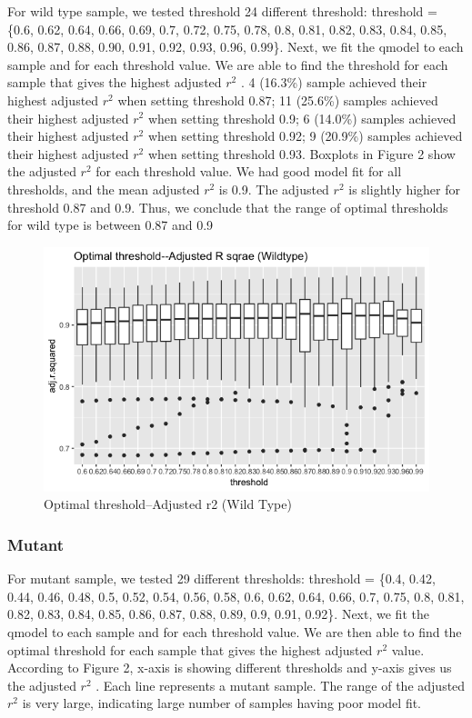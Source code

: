 \documentclass[10pt,letterpaper]{article}
\begin{document}
For wild type sample, we tested threshold 24 different threshold:
threshold = \{0.6, 0.62, 0.64, 0.66, 0.69, 0.7, 0.72, 0.75, 0.78, 0.8,
0.81, 0.82, 0.83, 0.84, 0.85, 0.86, 0.87, 0.88, 0.90, 0.91, 0.92, 0.93,
0.96, 0.99\}. Next, we fit the qmodel to each sample and for each
threshold value. We are able to find the threshold for each sample that
gives the highest adjusted \(r^2\) . 4 (16.3\%) sample achieved their
highest adjusted \(r^2\) when setting threshold 0.87; 11 (25.6\%)
samples achieved their highest adjusted \(r^2\) when setting threshold
0.9; 6 (14.0\%) samples achieved their highest adjusted \(r^2\) when
setting threshold 0.92; 9 (20.9\%) samples achieved their highest
adjusted \(r^2\) when setting threshold 0.93. Boxplots in Figure 2 show
the adjusted \(r^2\) for each threshold value. We had good model fit for
all thresholds, and the mean adjusted \(r^2\) is 0.9. The adjusted
\(r^2\) is slightly higher for threshold 0.87 and 0.9. Thus, we conclude
that the range of optimal thresholds for wild type is between 0.87 and
0.9

\begin{figure}
\includegraphics[width=0.9\linewidth]{visualization_paper/threshold_boxplot_wt} \caption{Optimal threshold--Adjusted r2 (Wild Type)}\label{fig:Figure2}
\end{figure}

\hypertarget{mutant}{%
\subsubsection{Mutant}\label{mutant}}

For mutant sample, we tested 29 different thresholds: threshold = \{0.4,
0.42, 0.44, 0.46, 0.48, 0.5, 0.52, 0.54, 0.56, 0.58, 0.6, 0.62, 0.64,
0.66, 0.7, 0.75, 0.8, 0.81, 0.82, 0.83, 0.84, 0.85, 0.86, 0.87, 0.88,
0.89, 0.9, 0.91, 0.92\}. Next, we fit the qmodel to each sample and for
each threshold value. We are then able to find the optimal threshold for
each sample that gives the highest adjusted \(r^2\) value. According to
Figure 2, x-axis is showing different thresholds and y-axis gives us the
adjusted \(r^2\) . Each line represents a mutant sample. The range of
the adjusted \(r^2\) is very large, indicating large number of samples
having poor model fit.
\end{document}
